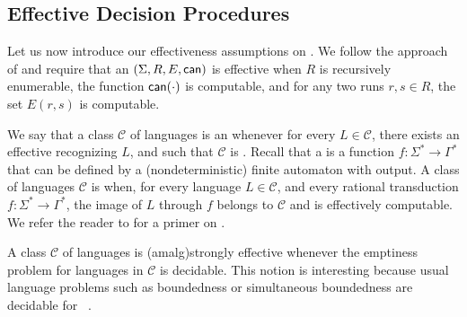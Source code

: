 \subsection{Effective Decision Procedures}
\label{infixes-amalgamation-effective:subsec}

\AP Let us now introduce our effectiveness assumptions on . We follow the approach of \cite{ASZZ24} and require that an
 $(\Sigma, R, E, \canrun)$ is effective when $R$ is
recursively enumerable, the function $\canrun(\cdot)$ is computable, and for
any two runs $r, s \in R$, the set $E(r,s)$ is computable.


\AP We say that a class $\mathcal{C}$ of languages is an  whenever for every $L \in \mathcal{C}$, there exists an
effective  recognizing $L$, and such that $\mathcal{C}$
is . Recall that a
 is a function $f \colon \Sigma^* \to \Gamma^*$
that can be defined by a (nondeterministic) finite automaton with output. A
class of languages $\mathcal{C}$ is  when, for every language $L \in \mathcal{C}$, and every rational
transduction $f \colon \Sigma^* \to \Gamma^*$, the image of $L$ through $f$
belongs to $\mathcal{C}$ and is effectively computable. We refer the reader to
\cite{BERST79} for a primer on .

\AP A class $\mathcal{C}$ of languages is \intro(amalg){strongly effective}
whenever the emptiness problem for languages in $\mathcal{C}$ is decidable.
This notion is interesting because usual language problems such as boundedness
or simultaneous boundedness are decidable for ~\cite{ASZZ24}. 


